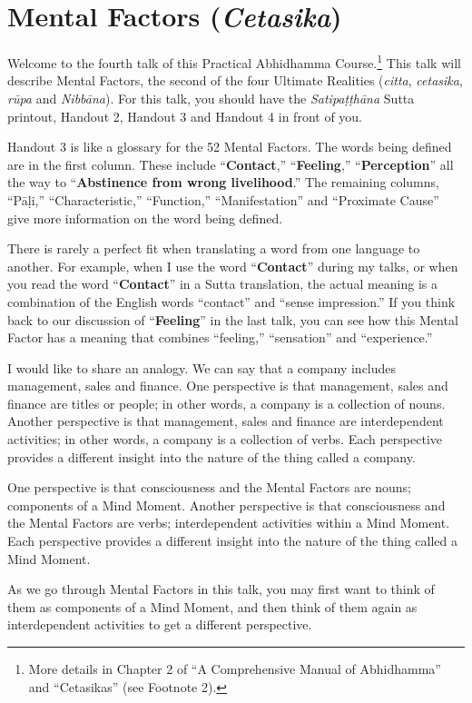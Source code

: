 \section{Mental Factors (\textit{Cetasika})}

Welcome to the fourth talk of this Practical Abhidhamma Course.\footnote{More details in Chapter 2 of “A Comprehensive Manual of Abhidhamma” and “Cetasikas” (see Footnote 2).} This talk will describe Mental Factors, the second of the four Ultimate Realities (\textit{citta}, \textit{cetasika}, \textit{rūpa} and \textit{Nibbāna}). For this talk, you should have the \textit{Satipaṭṭhāna} Sutta printout, Handout 2, Handout 3 and Handout 4 in front of you.

Handout 3 is like a glossary for the 52 Mental Factors. The words being defined are in the first column. These include “\textbf{Contact},” “\textbf{Feeling},” “\textbf{Perception}” all the way to “\textbf{Abstinence from wrong livelihood}.” The remaining columns, “Pāḷi,” “Characteristic,” “Function,” “Manifestation” and “Proximate Cause” give more information on the word being defined.

There is rarely a perfect fit when translating a word from one language to another. For example, when I use the word “\textbf{Contact}” during my talks, or when you read the word “\textbf{Contact}” in a Sutta translation, the actual meaning is a combination of the English words “contact” and “sense impression.” If you think back to our discussion of “\textbf{Feeling}” in the last talk, you can see how this Mental Factor has a meaning that combines “feeling,” “sensation” and “experience.”

I would like to share an analogy. We can say that a company includes management, sales and finance. One perspective is that management, sales and finance are titles or people; in other words, a company is a collection of nouns. Another perspective is that management, sales and finance are interdependent activities; in other words, a company is a collection of verbs. Each perspective provides a different insight into the nature of the thing called a company.

One perspective is that consciousness and the Mental Factors are nouns; components of a Mind Moment. Another perspective is that consciousness and the Mental Factors are verbs; interdependent activities within a Mind Moment. Each perspective provides a different insight into the nature of the thing called a Mind Moment.

As we go through Mental Factors in this talk, you may first want to think of them as components of a Mind Moment, and then think of them again as interdependent activities to get a different perspective.

